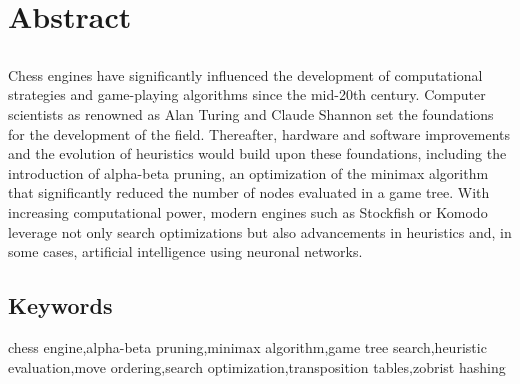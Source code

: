 \chapter*{Abstract}

\section*{\tituloPortadaEngVal}

Chess engines have significantly influenced the development of computational strategies and game-playing algorithms since the mid-20th century. Computer scientists as renowned as Alan Turing and Claude Shannon set the foundations for the development of the field. Thereafter, hardware and software improvements and the evolution of heuristics would build upon these foundations, including the introduction of alpha-beta pruning, an optimization of the minimax algorithm that significantly reduced the number of nodes evaluated in a game tree. With increasing computational power, modern engines such as Stockfish or Komodo leverage not only search optimizations but also advancements in heuristics and, in some cases, artificial intelligence using neuronal networks.

\section*{Keywords}

\noindent chess engine,alpha-beta pruning,minimax algorithm,game tree search,heuristic evaluation,move ordering,search optimization,transposition tables,zobrist hashing
